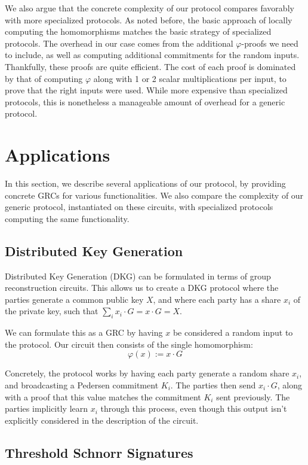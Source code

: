 We also argue that the concrete complexity of our protocol
compares favorably with more specialized protocols.
As noted before, the basic approach of locally computing
the homomorphisms matches the basic strategy of specialized protocols.
The overhead in our case comes from the additional $\varphi$-proofs
we need to include, as well as computing additional commitments
for the random inputs.
Thankfully, these proofs are quite efficient.
The cost of each proof is dominated by that of computing
$\varphi$ along with 1 or 2 scalar multiplications per input, to prove that
the right inputs were used.
While more expensive than specialized protocols,
this is nonetheless a manageable amount of overhead for
a generic protocol.

\section{Applications}
\label{sec:applications}

In this section, we describe several applications of our protocol,
by providing concrete GRCs
for various functionalities.
We also compare the complexity of our generic protocol,
instantiated on these circuits, with specialized
protocols computing the same functionality.

\subsection{Distributed Key Generation}
\label{sec:dkg}

Distributed Key Generation (DKG) can be formulated in terms of group
reconstruction circuits.
This allows us to create a DKG protocol where the parties
generate a common public key $X$, and where each party has
a share $x_i$ of the private key, such that $\sum_i x_i \cdot G = x \cdot G = X$.

We can formulate this as a GRC by having $x$ be considered a
random input to the protocol. 
Our circuit then consists of the single homomorphism:
$$
\varphi(x) := x \cdot G
$$

Concretely, the protocol works by having each party
generate a random share $x_i$, and broadcasting a Pedersen commitment
$K_i$.
The parties then send $x_i \cdot G$, along with a proof that
this value matches the commitment $K_i$ sent previously.
The parties implicitly learn $x_i$ through this process,
even though this output isn't explicitly considered in the description
of the circuit.


\subsection{Threshold Schnorr Signatures}
\label{sec:schnorr}

